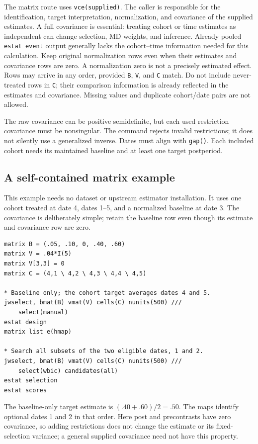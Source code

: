 \documentclass[11pt]{article}
\newcommand{\cmd}[1]{\texttt{#1}}
\begin{document}
The matrix route uses \cmd{vce(supplied)}. The caller is responsible for the
identification, target interpretation, normalization, and covariance of the
supplied estimates. A full covariance is essential: treating cohort or time
estimates as independent can change selection, MD weights, and inference.
Already pooled \cmd{estat event} output generally lacks the cohort--time
information needed for this calculation. Keep original normalization
rows even when their estimates and covariance rows are zero. A normalization
zero is not a precisely estimated effect. Rows may arrive in any order,
provided \cmd{B}, \cmd{V}, and \cmd{C} match. Do not include never-treated
rows in \cmd{C}; their comparison information is already reflected in the
estimates and covariance. Missing values and duplicate cohort/date pairs are
not allowed.

The raw covariance can be positive semidefinite, but each used restriction
covariance must be nonsingular. The command rejects invalid restrictions;
it does not silently use a generalized inverse. Dates must align with
\cmd{gap()}. Each included cohort needs its maintained baseline and at
least one target postperiod.

\subsection{A self-contained matrix example}
This example needs no dataset or upstream estimator installation. It uses one cohort
treated at date 4, dates 1--5, and a normalized baseline at date 3. The
covariance is deliberately simple; retain the baseline row even though its
estimate and covariance row are zero.
\begin{lstlisting}
matrix B = (.05, .10, 0, .40, .60)
matrix V = .04*I(5)
matrix V[3,3] = 0
matrix C = (4,1 \ 4,2 \ 4,3 \ 4,4 \ 4,5)

* Baseline only; the cohort target averages dates 4 and 5.
jwselect, bmat(B) vmat(V) cells(C) nunits(500) ///
    select(manual)
estat design
matrix list e(hmap)

* Search all subsets of the two eligible dates, 1 and 2.
jwselect, bmat(B) vmat(V) cells(C) nunits(500) ///
    select(wbic) candidates(all)
estat selection
estat scores
\end{lstlisting}
The baseline-only target estimate is $(.40+.60)/2=.50$.
The maps identify optional dates 1 and 2 in that order. Here post and
precontrasts have zero covariance, so adding restrictions does not change
the estimate or its fixed-selection variance; a general supplied covariance
need not have this property.
\end{document}
